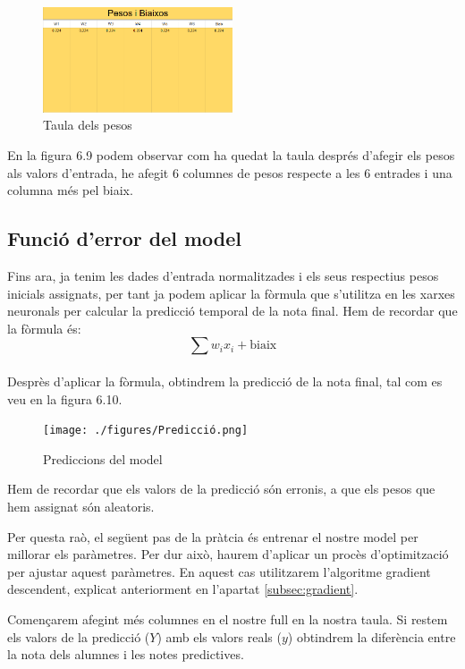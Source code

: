 \begin{figure}[H]
    \centering
    \includegraphics[width=0.5\textwidth]{./figures/Pesos.png}
    \caption{Taula dels pesos}
\end{figure}

En la figura 6.9 podem observar com ha quedat la taula després d'afegir els pesos als valors d'entrada, he afegit 6 columnes de pesos respecte a les 6 entrades i una columna més pel biaix.

\subsection{Funció d'error del model}
Fins ara, ja tenim les dades d'entrada normalitzades i els seus respectius pesos inicials assignats, per tant ja podem aplicar la fòrmula que s'utilitza en les xarxes neuronals per calcular la predicció temporal de la nota final. Hem de recordar que la fòrmula és:\\
\[
\sum w_i x_i + \text{biaix}
\] \\
Desprès d'aplicar la fòrmula, obtindrem la predicció de la nota final, tal com es veu en la figura 6.10.

\begin{figure}[H]
    \centering
    \texttt{[image: ./figures/Predicció.png]}
    \caption{Prediccions del model}
 \end{figure}

Hem de recordar que els valors de la predicció són erronis, a que els pesos que hem assignat són aleatoris.

Per questa raò, el següent pas de la pràtcia és entrenar el nostre model per millorar els paràmetres. Per dur això, haurem d'aplicar un procès d'optimització per ajustar aquest paràmetres. En aquest cas utilitzarem l'algoritme gradient descendent, explicat anteriorment en l'apartat \ref{subsec:gradient}.

Començarem afegint més columnes en el nostre full en la nostra taula. Si restem els valors de la predicció ($Y$) amb els valors reals ($y$) obtindrem la diferència entre la nota dels alumnes i les notes predictives.

